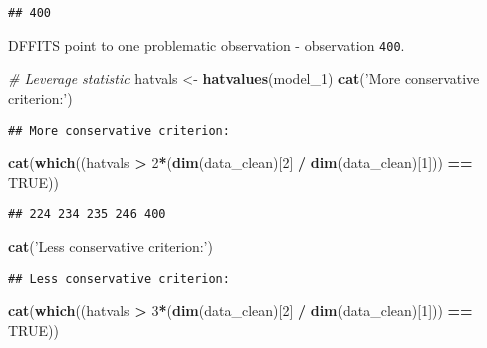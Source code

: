 \documentclass[]{article}
\newenvironment{Shaded}{\begin{snugshade}}{\end{snugshade}}
\newcommand{\CommentTok}[1]{\textcolor[rgb]{0.56,0.35,0.01}{\textit{#1}}}
\newcommand{\DecValTok}[1]{\textcolor[rgb]{0.00,0.00,0.81}{#1}}
\newcommand{\KeywordTok}[1]{\textcolor[rgb]{0.13,0.29,0.53}{\textbf{#1}}}
\newcommand{\NormalTok}[1]{#1}
\newcommand{\OperatorTok}[1]{\textcolor[rgb]{0.81,0.36,0.00}{\textbf{#1}}}
\newcommand{\OtherTok}[1]{\textcolor[rgb]{0.56,0.35,0.01}{#1}}
\newcommand{\StringTok}[1]{\textcolor[rgb]{0.31,0.60,0.02}{#1}}
\begin{document}
\begin{verbatim}
## 400
\end{verbatim}

DFFITS point to one problematic observation - observation \texttt{400}.

\begin{Shaded}
\begin{Highlighting}[]
\CommentTok{# Leverage statistic}
\NormalTok{hatvals <-}\StringTok{ }\KeywordTok{hatvalues}\NormalTok{(model_}\DecValTok{1}\NormalTok{)}
\KeywordTok{cat}\NormalTok{(}\StringTok{'More conservative criterion:'}\NormalTok{)}
\end{Highlighting}
\end{Shaded}

\begin{verbatim}
## More conservative criterion:
\end{verbatim}

\begin{Shaded}
\begin{Highlighting}[]
\KeywordTok{cat}\NormalTok{(}\KeywordTok{which}\NormalTok{((hatvals }\OperatorTok{>}\StringTok{ }\DecValTok{2}\OperatorTok{*}\NormalTok{(}\KeywordTok{dim}\NormalTok{(data_clean)[}\DecValTok{2}\NormalTok{] }\OperatorTok{/}\StringTok{ }\KeywordTok{dim}\NormalTok{(data_clean)[}\DecValTok{1}\NormalTok{])) }\OperatorTok{==}\StringTok{ }\OtherTok{TRUE}\NormalTok{))}
\end{Highlighting}
\end{Shaded}

\begin{verbatim}
## 224 234 235 246 400
\end{verbatim}

\begin{Shaded}
\begin{Highlighting}[]
\KeywordTok{cat}\NormalTok{(}\StringTok{'Less conservative criterion:'}\NormalTok{)}
\end{Highlighting}
\end{Shaded}

\begin{verbatim}
## Less conservative criterion:
\end{verbatim}

\begin{Shaded}
\begin{Highlighting}[]
\KeywordTok{cat}\NormalTok{(}\KeywordTok{which}\NormalTok{((hatvals }\OperatorTok{>}\StringTok{ }\DecValTok{3}\OperatorTok{*}\NormalTok{(}\KeywordTok{dim}\NormalTok{(data_clean)[}\DecValTok{2}\NormalTok{] }\OperatorTok{/}\StringTok{ }\KeywordTok{dim}\NormalTok{(data_clean)[}\DecValTok{1}\NormalTok{])) }\OperatorTok{==}\StringTok{ }\OtherTok{TRUE}\NormalTok{))}
\end{Highlighting}
\end{Shaded}
\end{document}
